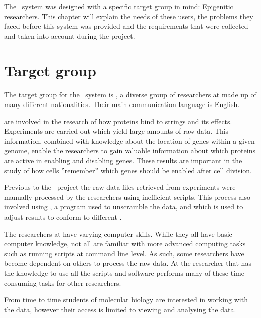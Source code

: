 The \appName\ system was designed with a specific target group in mind: Epigenitic researchers. This chapter will explain the needs of these users, the problems they faced before this system was provided and the requirements that were collected and taken into account during the project.
\section{Target group}

The target group for the \appName\ system is  , a diverse group of researchers at  made up of many different nationalities. Their main communication language is English.

 are involved in the research of how proteins bind to  strings and its effects. Experiments are carried out which yield large amounts of raw data. This information, combined with knowledge about the location of genes within a given genome, enable the researchers to gain valuable information about which proteins are active in enabling and disabling genes. These results are important in the study of how cells ''remember'' which genes should be enabled after cell division.

Previous to the \appName\ project the raw data files retrieved from experiments were manually processed by the researchers using inefficient  scripts. This process also involved using \cite{BOWTIE}, a program used to unscramble the  data, and \cite{LIFTOVER} which is used to adjust results to conform to different .

The researchers at  have varying computer skills. While they all have basic computer knowledge, not all are familiar with more advanced computing tasks such as running scripts at command line level. As such, some researchers have become dependent on others to process the raw data. At  the researcher that has the knowledge to use all the scripts and software performs many of these time consuming tasks for other researchers.

From time to time students of molecular biology are interested in working with the data, however their access is limited to viewing and analysing the data. 


